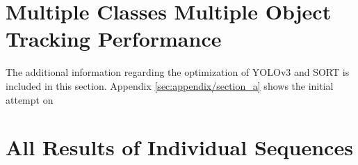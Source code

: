 \chapter{Multiple Classes Multiple Object Tracking Performance}
The additional information regarding the optimization of YOLOv3 and SORT is included in this section. Appendix \ref{sec:appendix/section_a} shows the initial attempt on 




\chapter{All Results of Individual Sequences}

\newpage

\newpage

\newpage

\newpage

\newpage

\newpage

\newpage

\newpage

\newpage

\newpage

\newpage

\newpage






